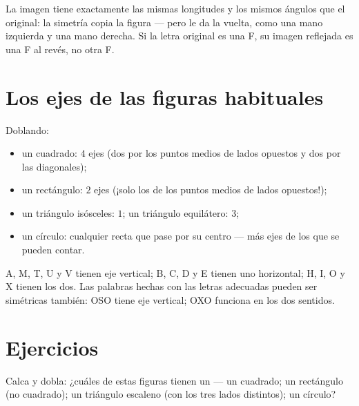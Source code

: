 \begin{example}\label{ex:g4:symmetry:properties}
La imagen tiene exactamente las mismas longitudes y los mismos ángulos que el
original: la simetría copia la figura --- pero le da la vuelta, como una
mano izquierda y una mano derecha. Si la letra original es una F, su imagen
reflejada es una F al revés, no otra F.
\end{example}

\section{Los ejes de las figuras habituales}

\begin{example}\label{ex:g4:symmetry:shapes}
Doblando:
\begin{itemize}
  \item un cuadrado: $4$ ejes (dos por los puntos medios de lados
        opuestos y dos por las diagonales);
  \item un rectángulo: $2$ ejes (¡solo los de los puntos medios de lados opuestos!);
  \item un triángulo isósceles: $1$; un triángulo equilátero: $3$;
  \item un círculo: cualquier recta que pase por su centro --- más ejes de los
        que se pueden contar.
\end{itemize}
\end{example}

\begin{example}\label{ex:g4:symmetry:letters}
A, M, T, U y V tienen eje vertical; B, C, D y E tienen uno
horizontal; H, I, O y X tienen los dos. Las palabras hechas con las letras adecuadas pueden
ser simétricas también: OSO tiene eje vertical; OXO funciona en los dos sentidos.
\end{example}

\section{Ejercicios}

\begin{exercise}[$\star$]\label{exo:g4:symmetry:1}
Calca y dobla: ¿cuáles de estas figuras tienen un  --- un
cuadrado; un rectángulo (no cuadrado); un triángulo escaleno (con los tres lados
distintos); un círculo?
\end{exercise}

